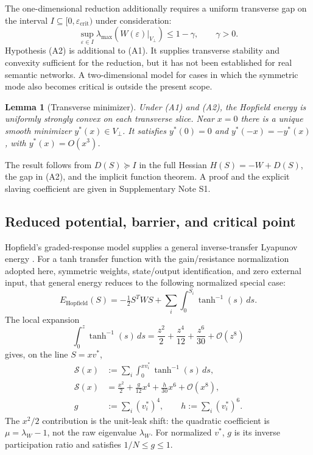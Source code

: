 \documentclass[a4paper,twocolumn,10pt]{article}
\newtheorem{lemma}{Lemma}
\newcommand{\eps}{\varepsilon}
\begin{document}
The one-dimensional reduction additionally requires a uniform transverse gap on the interval
$I\subseteq[0,\eps_{\mathrm{crit}})$ under consideration:
\begin{equation}
\tag{A2}
\sup_{\eps\in I}\lambda_{\max}\!\left(W(\eps)\big|_{V_\perp}\right)\leq1-\gamma,
\qquad \gamma>0.
\label{eq:A2}
\end{equation}
Hypothesis (A2) is additional to (A1). It supplies transverse stability and convexity sufficient for
the reduction, but it has not been established for real semantic networks. A two-dimensional model
for cases in which the symmetric mode also becomes critical is outside the present scope.

\begin{lemma}[Transverse minimizer]
\label{lem:transverse}
Under (A1) and (A2), the Hopfield energy is uniformly strongly convex on each transverse slice. Near
$x=0$ there is a unique smooth minimizer $y^*(x)\in V_\perp$. It satisfies
$y^*(0)=0$ and $y^*(-x)=-y^*(x)$, with $y^*(x)=O(x^3)$.
\end{lemma}
The result follows from $D(S)\succeq I$ in the full Hessian
$H(S)=-W+D(S)$, the gap in (A2), and the implicit function theorem. A proof and the explicit slaving
coefficient are given in Supplementary Note S1.

\subsection{Reduced potential, barrier, and critical point}

Hopfield's graded-response model supplies a general inverse-transfer Lyapunov energy
\citep{hopfield1984graded}. For a tanh transfer function with the gain/resistance normalization
adopted here, symmetric weights, state/output identification, and zero external input, that general
energy reduces to the following normalized special case:
\begin{equation}
E_{\mathrm{Hopfield}}(S)=-\tfrac12S^TWS+
\sum_i\int_0^{S_i}\tanh^{-1}(s)\,ds.
\label{eq:hopfield_full}
\end{equation}
The local expansion
\begin{equation}
\int_0^z\tanh^{-1}(s)\,ds
=\frac{z^2}{2}+\frac{z^4}{12}+\frac{z^6}{30}+\mathcal{O}(z^8)
\label{eq:taylor}
\end{equation}
gives, on the line $S=xv^*$,
\begin{equation}
\begin{aligned}
\mathcal{S}(x)&:=\sum_i\int_0^{xv_i^*}\tanh^{-1}(s)\,ds,\\
\mathcal{S}(x)&=\frac{x^2}{2}+\frac{g}{12}x^4+\frac{h}{30}x^6
+\mathcal{O}(x^8),\\
g&:=\sum_i(v_i^*)^4,\qquad h:=\sum_i(v_i^*)^6.
\end{aligned}
\label{eq:saturation_mode}
\end{equation}
The $x^2/2$ contribution is the unit-leak shift: the quadratic coefficient is
$\mu=\lambda_W-1$, not the raw eigenvalue $\lambda_W$. For normalized $v^*$, $g$ is its inverse
participation ratio and satisfies $1/N\leq g\leq1$.
\end{document}
